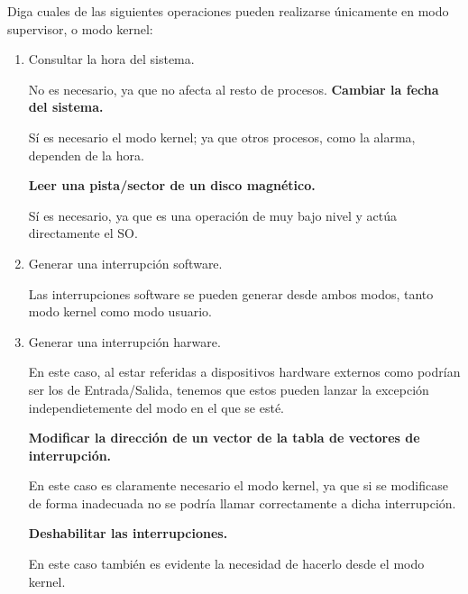 \begin{ejercicio}\label{ej:2.Ejercicio7}
    Diga cuales de las siguientes operaciones pueden realizarse únicamente en modo supervisor, o modo kernel:
    \begin{enumerate}[label=(\alph*)]
      \item Consultar la hora del sistema.

      No es necesario, ya que no afecta al resto de procesos.
      \myitem \textbf{Cambiar la fecha del sistema.}

      Sí es necesario el modo kernel; ya que otros procesos, como la alarma, dependen de la hora.
      
      \myitem \textbf{Leer una pista/sector de un disco magnético.}
      
      Sí es necesario, ya que es una operación de muy bajo nivel y actúa directamente el SO.
      
      \item Generar una interrupción software.

      Las interrupciones software se pueden generar desde ambos modos, tanto modo kernel como modo usuario.
      
      \item Generar una interrupción harware.

      En este caso, al estar referidas a dispositivos hardware externos como podrían ser los de Entrada/Salida, tenemos que estos pueden lanzar la excepción independietemente del modo en el que se esté.
      
      \myitem \textbf{Modificar la dirección de un vector de la tabla de vectores de interrupción.}

      En este caso es claramente necesario el modo kernel, ya que si se modificase de forma inadecuada no se podría llamar correctamente a dicha interrupción.
      
      \myitem \textbf{Deshabilitar las interrupciones.}

      En este caso también es evidente la necesidad de hacerlo desde el modo kernel.
    \end{enumerate}
\end{ejercicio}

